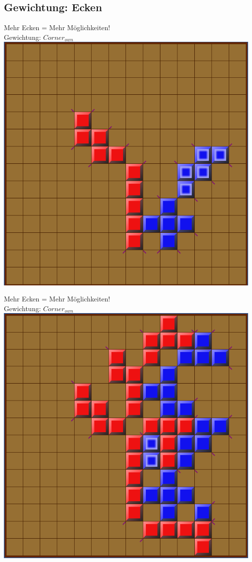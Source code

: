 \documentclass[12pt]{beamer}
\begin{document}
\subsection{Gewichtung: Ecken}
\begin{frame}
	Mehr Ecken = Mehr Möglichkeiten!\\
	\pause
	Gewichtung: $Corner_{own}$\\
	\pause
	\includegraphics[width=0.6\linewidth]{media/wgh2.png}
\end{frame}
\begin{frame}
	Mehr Ecken = Mehr Möglichkeiten!\\
	Gewichtung: $Corner_{own}$\\
	\includegraphics[width=0.6\linewidth]{media/wgh3.png}
\end{frame}
\end{document}
